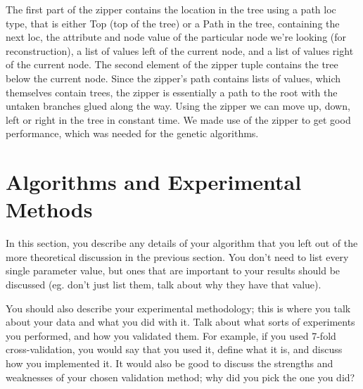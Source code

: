 \documentclass[12pt, letterpaper]{article}
\begin{document}
The first part of the zipper contains the location in the tree using a path loc type, that is either Top (top of the tree) or a Path in the tree, containing the next loc, the attribute and node value of the particular node we're looking (for reconstruction), a list of values left of the current node, and a list of values right of the current node. The second element of the zipper tuple contains the tree below the current node. Since the zipper's path contains lists of values, which themselves contain trees, the zipper is essentially a path to the root with the untaken branches glued along the way.  Using the zipper we can move up, down, left or right in the tree in constant time. We made use of the zipper to get good performance, which was needed for the genetic algorithms.


\section{Algorithms and Experimental Methods}

In this section, you describe any details of your algorithm that you left out of
the more theoretical discussion in the previous section.  You don't need to list
every single parameter value, but ones that are important to your results should
be discussed (eg. don't just list them, talk about why they have that value).

You should also describe your experimental methodology; this is where you talk
about your data and what you did with it.  Talk about what sorts of experiments
you performed, and how you validated them.  For example, if you used 7-fold
cross-validation, you would say that you used it, define what it is, and discuss
how you implemented it.  It would also be good to discuss the strengths and
weaknesses of your chosen validation method; why did you pick the one you did?
\end{document}

